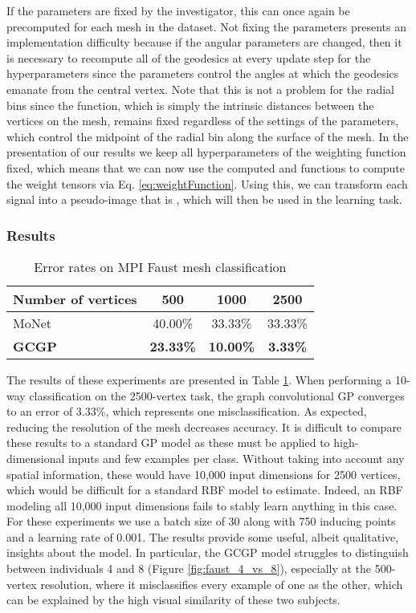 \documentclass{article}
\begin{document}
If the  parameters are fixed by the investigator, this can once again be precomputed for each mesh in the dataset. Not fixing the parameters presents an implementation difficulty because if the angular parameters are changed, then it is necessary to recompute all of the geodesics at every update step for the hyperparameters since the  parameters control the angles at which the geodesics emanate from the central vertex. Note that this is not a problem for the radial bins since the  function, which is simply the intrinsic distances between the vertices on the mesh, remains fixed regardless of the settings of the  parameters, which control the midpoint of the radial bin along the surface of the mesh. In the presentation of our results we keep all hyperparameters of the weighting function fixed, which means that we can now use the computed  and  functions to compute the weight tensors via Eq. \eqref{eq:weightFunction}. Using this, we can transform each signal into a pseudo-image that is , which will then be used in the learning task.
\fi

\subsubsection{Results}



\begin{table}[tb]
	\centering
	\caption{Error rates on MPI Faust mesh classification}
	\label{tab:MPIFAUST}
	\begin{tabular}{lccc}
		\toprule
		Number of vertices & 500 &  1000 & 2500\\
		\midrule
		MoNet & 40.00\% & 33.33\% & 33.33\% \\ 
		\textbf{GCGP} & \textbf{23.33\%} & \textbf{10.00\%} & \textbf{3.33\%}\\
	\end{tabular}
	\vspace{-.6cm}
\end{table}

The results of these experiments are presented in Table \ref{tab:MPIFAUST}. When performing a 10-way classification on the 2500-vertex task, the graph convolutional GP converges to an error of 3.33\%, which represents one misclassification. As expected, reducing the resolution of the mesh decreases accuracy. It is difficult to compare these results to a standard GP model as these must be applied to high-dimensional inputs and few examples per class. Without taking into account any spatial information, these would have 10,000 input dimensions for 2500 vertices, which would be difficult for a standard RBF model to estimate. Indeed, an RBF modeling all 10,000 input dimensions fails to stably learn anything in this case. For these experiments we use a batch size of 30 along with 750 inducing points and a learning rate of 0.001. The results provide some useful, albeit qualitative, insights about the model. In particular, the GCGP model struggles to distinguish between individuals 4 and 8 (Figure \ref{fig:faust_4_vs_8}), especially at the 500-vertex resolution, where it misclassifies every example of one as the other, which can be explained by the high visual similarity of these two subjects.
\end{document}
